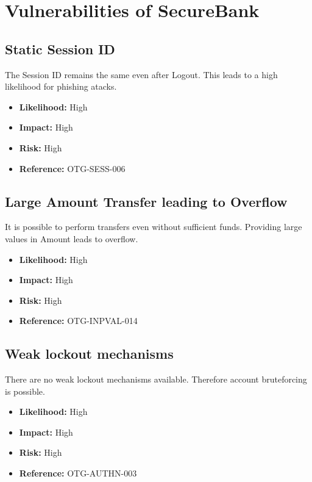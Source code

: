 \section{Vulnerabilities of SecureBank}

\subsection{Static Session ID}
The Session ID remains the same even after Logout.
This leads to a high likelihood for phishing atacks.
\begin{itemize}
	\item \textbf{Likelihood:} High
	\item \textbf{Impact:} High
	\item \textbf{Risk:} High
	\item \textbf{Reference:} OTG-SESS-006
\end{itemize}

\subsection{Large Amount Transfer leading to Overflow}
It is possible to perform transfers even without sufficient funds.
Providing large values in Amount leads to overflow.
\begin{itemize}
	\item \textbf{Likelihood:} High
	\item \textbf{Impact:} High
	\item \textbf{Risk:} High
	\item \textbf{Reference:} OTG-INPVAL-014
\end{itemize}

\subsection{Weak lockout mechanisms}
There are no weak lockout mechanisms available. Therefore account bruteforcing is possible.
\begin{itemize}
	\item \textbf{Likelihood:} High
	\item \textbf{Impact:} High
	\item \textbf{Risk:} High
	\item \textbf{Reference:} OTG-AUTHN-003
\end{itemize}